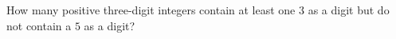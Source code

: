 How many positive three-digit integers contain at least one $3$ as a digit but do not contain a $5$ as a digit?
